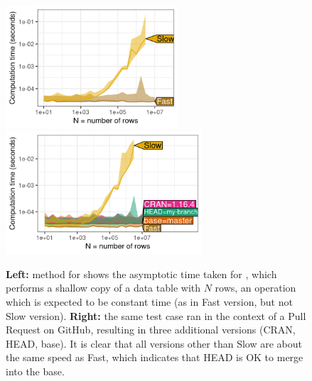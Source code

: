 \begin{figure}[t]
    \centering
    \includegraphics[height=1.8in]{data.table-atime_versions.png}
\includegraphics[height=1.8in]{data.table-atime_test.png}
     \caption{\textbf{Left:}  method for  shows the asymptotic time taken for , which performs a shallow copy of a data table with $N$ rows, an operation which is expected to be constant time (as in Fast version, but not Slow version).
     \textbf{Right:} the same test case ran in the context of a Pull Request on GitHub, resulting in three additional versions (CRAN, HEAD, base).
     It is clear that all versions other than Slow are about the same speed as Fast, which indicates that HEAD is OK to merge into the base.}
    \label{fig:plot-perf-test-fast-slow}
\end{figure}


